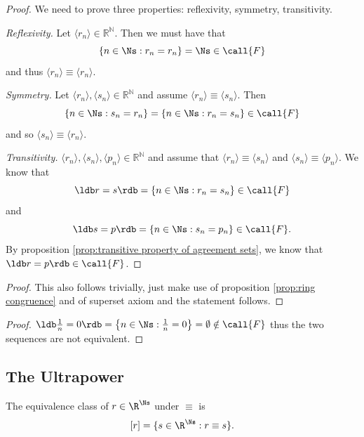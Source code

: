 \begin{proof}
    We need to prove three properties: reflexivity, symmetry, transitivity. 

    \emph{Reflexivity.} Let $\langle r_n \rangle \in \mathbb{R}^\mathbb{N}$. Then we must have that 
    $$
    \{ n \in \Ns : r_n = r_n \} = \Ns \in \call{F}
    $$
    and thus $\langle r_n \rangle \equiv \langle r_n \rangle$.

    \emph{Symmetry.} Let $\langle r_n \rangle, \langle s_n \rangle \in \mathbb{R}^\mathbb{N}$ and assume $\langle r_n \rangle \equiv \langle s_n \rangle$. Then 
    $$
    \{ n \in \Ns : s_n = r_n \} = \{ n \in \Ns : r_n = s_n \} \in \call{F}
    $$
    and so $\langle s_n \rangle \equiv \langle r_n \rangle$.

    \emph{Transitivity.} $\langle r_n \rangle, \langle s_n \rangle, \langle p_n \rangle \in \mathbb{R}^\mathbb{N}$ and assume that $\langle r_n \rangle \equiv \langle s_n \rangle$ and $\langle s_n \rangle \equiv \langle p_n \rangle$. We know that
    $$
    \ldb r=s\rdb = \{ n \in \Ns : r_n = s_n \} \in \call{F}
    $$
    and
    $$
    \ldb s=p\rdb = \{ n \in \Ns : s_n = p_n \} \in \call{F}.
    $$
    By proposition \ref{prop:transitive property of agreement sets}, we know that $\ldb r=p\rdb \in \call{F}$.
\end{proof}
\begin{proof}
        This also follows trivially, just make use of proposition \ref{prop:ring congruence} and of superset axiom and the statement follows. 
\end{proof}

    
\begin{proof}
    $\ldb \frac{1}{n} = 0 \rdb = \left\{ n \in \Ns : \frac{1}{n} = 0  \right\}=\emptyset \notin \call{F}$ thus the two sequences are not equivalent. 
\end{proof}

\subsection{The Ultrapower}

The equivalence class of $r \in \R^\Ns$ under $\equiv$ is
$$
[r] = \{s \in \R^\Ns : r \equiv s\}.
$$

